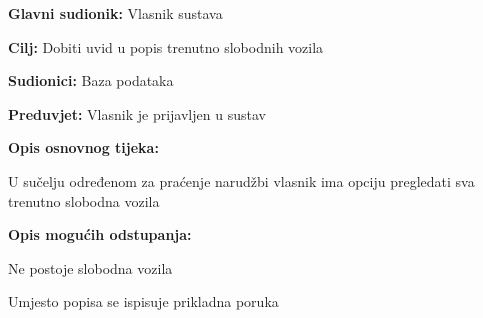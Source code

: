 					\noindent {}
					\begin{packed_item}
	
						\item \textbf{Glavni sudionik: }Vlasnik sustava
						\item  \textbf{Cilj: }Dobiti uvid u popis trenutno slobodnih vozila
						\item  \textbf{Sudionici: }Baza podataka
						\item  \textbf{Preduvjet: }Vlasnik je prijavljen u sustav
						\item  \textbf{Opis osnovnog tijeka:}
						
						\item[] \begin{packed_enum}
							\item U sučelju određenom za praćenje narudžbi vlasnik ima opciju pregledati sva trenutno slobodna vozila
						\end{packed_enum}
						
						\item  \textbf{Opis mogućih odstupanja:}
						
						\item[] \begin{packed_item}
	
							\item[1.a] Ne postoje slobodna vozila
							\item[] \begin{packed_enum}
								\item Umjesto popisa se ispisuje prikladna poruka
							\end{packed_enum}
						\end{packed_item}
					\end{packed_item}
					
